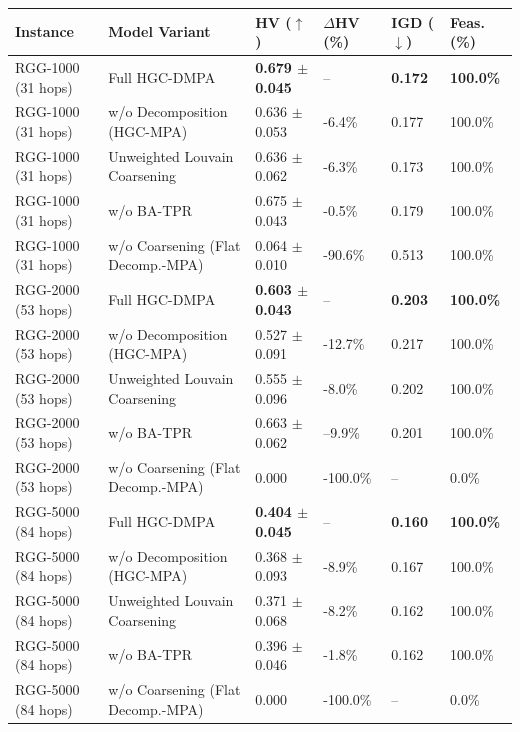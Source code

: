 \begin{tabular}{llllll}
\toprule
Instance & Model Variant & HV ($\uparrow$) & $\Delta$HV (\%) & IGD ($\downarrow$) & Feas. (\%) \\
\midrule
RGG-1000 (31 hops) & Full HGC-DMPA & \textbf{0.679 $\pm$ 0.045} & -- & \textbf{0.172} & \textbf{100.0\%} \\
RGG-1000 (31 hops) & w/o Decomposition (HGC-MPA) & 0.636 $\pm$ 0.053 & -6.4\% & 0.177 & 100.0\% \\
RGG-1000 (31 hops) & Unweighted Louvain Coarsening & 0.636 $\pm$ 0.062 & -6.3\% & 0.173 & 100.0\% \\
RGG-1000 (31 hops) & w/o BA-TPR & 0.675 $\pm$ 0.043 & -0.5\% & 0.179 & 100.0\% \\
RGG-1000 (31 hops) & w/o Coarsening (Flat Decomp.-MPA) & 0.064 $\pm$ 0.010 & -90.6\% & 0.513 & 100.0\% \\
RGG-2000 (53 hops) & Full HGC-DMPA & \textbf{0.603 $\pm$ 0.043} & -- & \textbf{0.203} & \textbf{100.0\%} \\
RGG-2000 (53 hops) & w/o Decomposition (HGC-MPA) & 0.527 $\pm$ 0.091 & -12.7\% & 0.217 & 100.0\% \\
RGG-2000 (53 hops) & Unweighted Louvain Coarsening & 0.555 $\pm$ 0.096 & -8.0\% & 0.202 & 100.0\% \\
RGG-2000 (53 hops) & w/o BA-TPR & 0.663 $\pm$ 0.062 & --9.9\% & 0.201 & 100.0\% \\
RGG-2000 (53 hops) & w/o Coarsening (Flat Decomp.-MPA) & 0.000 & -100.0\% & -- & 0.0\% \\
RGG-5000 (84 hops) & Full HGC-DMPA & \textbf{0.404 $\pm$ 0.045} & -- & \textbf{0.160} & \textbf{100.0\%} \\
RGG-5000 (84 hops) & w/o Decomposition (HGC-MPA) & 0.368 $\pm$ 0.093 & -8.9\% & 0.167 & 100.0\% \\
RGG-5000 (84 hops) & Unweighted Louvain Coarsening & 0.371 $\pm$ 0.068 & -8.2\% & 0.162 & 100.0\% \\
RGG-5000 (84 hops) & w/o BA-TPR & 0.396 $\pm$ 0.046 & -1.8\% & 0.162 & 100.0\% \\
RGG-5000 (84 hops) & w/o Coarsening (Flat Decomp.-MPA) & 0.000 & -100.0\% & -- & 0.0\% \\
\bottomrule
\end{tabular}
